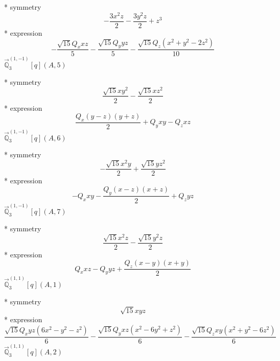 \documentclass[fleqn,8pt]{jsarticle}
\begin{document}
\noindent\quad ** symmetry
\begin{dmath*}
- \frac{3 x^{2} z}{2} - \frac{3 y^{2} z}{2} + z^{3}
\end{dmath*}
\noindent\quad ** expression
\begin{dmath*}
- \frac{\sqrt{15} Q_{x} x z}{5} - \frac{\sqrt{15} Q_{y} y z}{5} - \frac{\sqrt{15} Q_{z} \left(x^{2} + y^{2} - 2 z^{2}\right)}{10}
\end{dmath*}
\noindent\quad $\vec{\mathbb{Q}}_{3}^{(1,-1)}[q](A,5)$

\noindent\quad ** symmetry
\begin{dmath*}
\frac{\sqrt{15} x y^{2}}{2} - \frac{\sqrt{15} x z^{2}}{2}
\end{dmath*}
\noindent\quad ** expression
\begin{dmath*}
\frac{Q_{x} \left(y - z\right) \left(y + z\right)}{2} + Q_{y} x y - Q_{z} x z
\end{dmath*}
\noindent\quad $\vec{\mathbb{Q}}_{3}^{(1,-1)}[q](A,6)$

\noindent\quad ** symmetry
\begin{dmath*}
- \frac{\sqrt{15} x^{2} y}{2} + \frac{\sqrt{15} y z^{2}}{2}
\end{dmath*}
\noindent\quad ** expression
\begin{dmath*}
- Q_{x} x y - \frac{Q_{y} \left(x - z\right) \left(x + z\right)}{2} + Q_{z} y z
\end{dmath*}
\noindent\quad $\vec{\mathbb{Q}}_{3}^{(1,-1)}[q](A,7)$

\noindent\quad ** symmetry
\begin{dmath*}
\frac{\sqrt{15} x^{2} z}{2} - \frac{\sqrt{15} y^{2} z}{2}
\end{dmath*}
\noindent\quad ** expression
\begin{dmath*}
Q_{x} x z - Q_{y} y z + \frac{Q_{z} \left(x - y\right) \left(x + y\right)}{2}
\end{dmath*}
\noindent\quad $\vec{\mathbb{Q}}_{3}^{(1,1)}[q](A,1)$

\noindent\quad ** symmetry
\begin{dmath*}
\sqrt{15} x y z
\end{dmath*}
\noindent\quad ** expression
\begin{dmath*}
\frac{\sqrt{15} Q_{x} y z \left(6 x^{2} - y^{2} - z^{2}\right)}{6} - \frac{\sqrt{15} Q_{y} x z \left(x^{2} - 6 y^{2} + z^{2}\right)}{6} - \frac{\sqrt{15} Q_{z} x y \left(x^{2} + y^{2} - 6 z^{2}\right)}{6}
\end{dmath*}
\noindent\quad $\vec{\mathbb{Q}}_{3}^{(1,1)}[q](A,2)$
\end{document}
